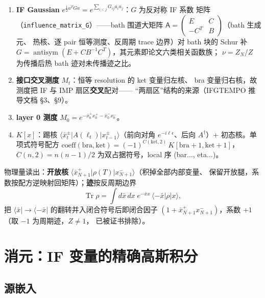 \documentclass[11pt,a4paper]{ctexart}
\newcommand{\xb}{\bar x}          %
\newcommand{\Tr}{\operatorname{Tr}}
\newcommand{\antisym}{\operatorname{antisym}}
\begin{document}
\begin{enumerate}
\item \textbf{IF Gaussian}
  $e^{\frac12 a^TGa}=e^{\sum_{i<j}G_{ij}a_ia_j}$：$G$ 为反对称 IF 系数
  矩阵（\texttt{influence\_matrix\_G}）——bath 围道大矩阵
  $\mathsf A=\begin{pmatrix}E&C\\-C^{T}&B\end{pmatrix}$（bath 生成元、
  热核、逐 pair 恒等测度、反周期 trace 边界）对 bath 块的 Schur 补
  $G=\antisym(E+CB^{-1}C^{T})$，其元素即论文六类相关函数族；
  $\nu=Z_N/Z$ 为传播后热 bath 迹对未传播迹之比。
\item \textbf{接口交叉测度} $M_t$：恒等 resolution 的 ket 变量归左核、
  bra 变量归右核，故测度把 IF 与 IMP 扇区\textbf{交叉}配对——
  ``两扇区''结构的来源（IFGTEMPO 推导文档 \S3、\S9）。
\item \textbf{layer 0 测度}
  $M_0=e^{-\xb_0^{+}x_0^{+}-\xb_0^{-}x_0^{-}}$。
\item \textbf{$K[x]$}：踢核
  $\langle\xb_t^{\pm}|A(\ell_t)|x_{t-1}^{\pm}\rangle$（前向对角
  $e^{-i\ell\epsilon}$、后向 $A^\dagger$）+ 初态核。单项式符号配方
  $\mathrm{coeff}(\mathrm{bra},\mathrm{ket})
  =(-1)^{C(\mathrm{ket},2)}\,K[\mathrm{bra}{+}1,\mathrm{ket}{+}1]$，
  $C(n,2)=n(n{-}1)/2$ 为双占据符号，local 序 (bar$\dots$, eta$\dots$)。
\end{enumerate}

物理量读出：\textbf{开放核}
$\langle\xb_{N+1}^{+}|\rho(T)|x_{N+1}^{-}\rangle$（积掉全部内部变量、
保留开放腿，系数按配方逆映射回矩阵）；\textbf{迹}按反周期边界
\begin{equation}
\Tr\rho=\int d\bar x\,dx\;e^{-\bar xx}\,
\langle-\bar x|\rho|x\rangle ,
\label{eq:trace}
\end{equation}
把 $\langle\bar x|\to\langle-\bar x|$ 的翻转并入闭合符号后即闭合因子
$(1+\xb_{N+1}^{+}x_{N+1}^{-})$，系数 $+1$（取 $-1$ 为周期迹，$Z\ne1$，
已被证书排除）。

\section{消元：IF 变量的精确高斯积分}
\label{sec:elim}

\subsection{源嵌入}
\end{document}
